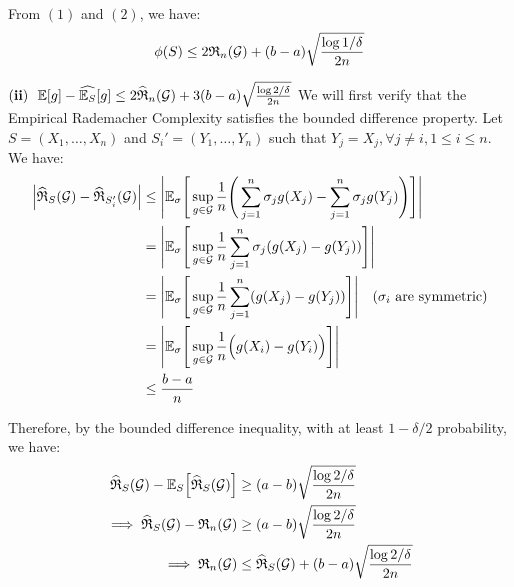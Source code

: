 \begin{proof*}
    \noindent From $(1)$ and $(2)$, we have:
    \begin{align*}
        \phi(S) \le 2\mathfrak{R}_n(\mathcal{G}) + (b-a)\sqrt{
            \frac{\log 1/\delta}{2n}
        }
    \end{align*}

    \begin{subproof}{\newline ${\bf (ii)} \ \ \mathbb{E}[g] - \widehat{\mathbb{E}_S}[g] \le 2\widehat{\mathfrak{R}}_n(\mathcal{G}) + 3(b-a)\sqrt{\frac{\log2/\delta}{2n}}$}
        We will first verify that the Empirical Rademacher Complexity satisfies the bounded difference property. Let $S=(X_1, \dots, X_n)$ and $S_i'=(Y_1, \dots, Y_n)$ such that $Y_j=X_j, \forall j \ne i, 1 \le i \le n$. We have:
        \begin{align*}
            \Big|  \widehat{\mathfrak{R}}_S(\mathcal{G}) - \widehat{\mathfrak{R}}_{S_i'}(\mathcal{G})  \Big| 
                &\le \Bigg| 
                    \mathbb{E}_\sigma\Bigg[ 
                        \sup_{g\in\mathcal{G}} \frac{1}{n} \Bigg( 
                            \sum_{j=1}^n \sigma_j g(X_j) - \sum_{j=1}^n \sigma_j g(Y_j)
                         \Bigg)
                     \Bigg]
                 \Bigg| \\
                &= \Bigg| 
                    \mathbb{E}_\sigma\Bigg[ 
                        \sup_{g\in\mathcal{G}} \frac{1}{n} \sum_{j=1}^n \sigma_j (g(X_j) - g(Y_j))
                     \Bigg]
                 \Bigg| \\
                &= \Bigg| 
                    \mathbb{E}_\sigma\Bigg[ 
                        \sup_{g\in\mathcal{G}} \frac{1}{n} \sum_{j=1}^n (g(X_j) - g(Y_j))
                     \Bigg]
                 \Bigg| \ \ \ (\sigma_i \text{ are symmetric}) \\
                &= \Bigg| 
                    \mathbb{E}_\sigma\Bigg[ 
                        \sup_{g\in\mathcal{G}} \frac{1}{n} \Big( 
                            g(X_i) - g(Y_i)
                         \Big)
                     \Bigg]
                 \Bigg| \\
                &\le \frac{b-a}{n}
        \end{align*}

        \noindent Therefore, by the bounded difference inequality, with at least $1-\delta/2$ probability, we have:
        \begin{align*}
            \widehat{\mathfrak{R}}_S(\mathcal{G}) - \mathbb{E}_S\Big[ \widehat{\mathfrak{R}}_S(\mathcal{G}) \Big] &\ge (a-b)\sqrt{\frac{\log 2/\delta}{2n}} \\
            \implies \widehat{\mathfrak{R}}_S(\mathcal{G}) - \mathfrak{R}_n(\mathcal{G}) &\ge (a-b)\sqrt{\frac{\log 2/\delta}{2n}} \\
            \implies \mathfrak{R}_n(\mathcal{G})  &\le \widehat{\mathfrak{R}}_S(\mathcal{G}) + (b-a)\sqrt{\frac{\log 2/\delta}{2n}}
        \end{align*}


\end{subproof}
\end{proof*}
